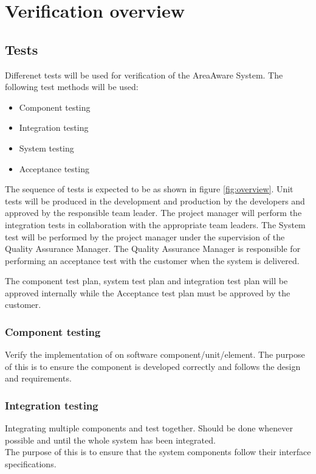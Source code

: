 \chapter{Verification overview}
\label{chp:testOverview}

\section{Tests}
Differenet tests will be used for verification of the AreaAware System. The following test methods will be used:

\begin{itemize}
	\item Component testing
	\item Integration testing
	\item System testing
	\item Acceptance testing



\end{itemize}

The sequence of tests is expected to be as shown in figure \ref{fig:overview}. Unit tests will be produced in the development and production by the developers and approved by the responsible team leader. 
The project manager will perform the integration tests in collaboration with the appropriate team leaders.
The System test will be performed by the project manager under the supervision of the Quality Assurance Manager.
The Quality Assurance Manager is responsible for performing an acceptance test with the customer when the system is delivered.



The component test plan, system test plan and integration test plan will be approved internally while the Acceptance test plan must be approved by the customer. 

\subsection{Component testing}
Verify the implementation of on software component/unit/element. The purpose of this is to ensure the component is developed correctly and follows the design and requirements. 

\subsection{Integration testing}
Integrating multiple components and test together. Should be done whenever possible and until the whole system has been integrated. \\
The purpose of this is to ensure that the system components follow their interface specifications.


